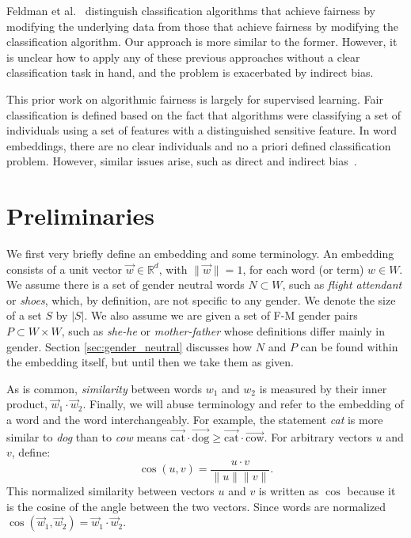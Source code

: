 \documentclass{article}
\newcommand{\wvec}[1]{\overrightarrow{\text{#1}}}
\begin{document}
Feldman et al.~\cite{feldman2015certifying} distinguish classification algorithms that achieve fairness by modifying the underlying data from those that achieve fairness by modifying the classification algorithm. Our approach is more similar to the former. However, it is unclear how to apply any of these previous approaches without a clear classification task in hand, and the problem is exacerbated by indirect bias.  

This prior work on algorithmic fairness is largely for supervised learning. Fair classification is defined based on the fact that algorithms were classifying a set of individuals using a set of features with a distinguished sensitive feature. In word embeddings, there are no clear individuals and no a priori defined classification problem. However, similar issues arise, such as direct and indirect bias~\cite{pedreshi2008discrimination}.

\section{Preliminaries}\label{sec:defs}

We first very briefly define an embedding and some terminology. An embedding consists of a unit vector $\vec{w}\in \mathbb{R}^d$, with $\|\vec{w}\|=1$, for each word (or term) $w\in W$. We assume there is a set of gender neutral words $N \subset W$, such as {\em flight attendant} or {\em shoes}, which, by definition, are not specific to any gender. We denote the size of a set $S$ by $|S|$. We also assume we are given a set of F-M gender pairs $P\subset W \times W$, such as 
{\em she-he} or {\em mother-father} whose definitions differ mainly in gender. Section \ref{sec:gender_neutral} discusses how $N$ and $P$ can be found within the embedding itself, but until then we take them as given. 

As is common, {\em similarity} between words $w_1$ and $w_2$ is measured by their inner product, $\vec{w}_1 \cdot \vec{w}_2.$ Finally, we will abuse terminology and refer to the embedding of a word and the word interchangeably. For example, the statement {\em cat} is more similar to {\em dog} than to {\em cow} means $\wvec{cat}\cdot \wvec{dog} \geq \wvec{cat}\cdot \wvec{cow}$. For arbitrary vectors $u$ and $v$, define:
$$\cos(u,v) = \frac{u \cdot v}{\|u\|\|v\|}.$$
This normalized similarity between vectors $u$ and $v$ is written as $\cos$ because it is the cosine of the angle between the two vectors. 
Since words are normalized $\cos(\vec{w}_1,\vec{w}_2) = \vec{w}_1 \cdot \vec{w}_2$.
\end{document}
